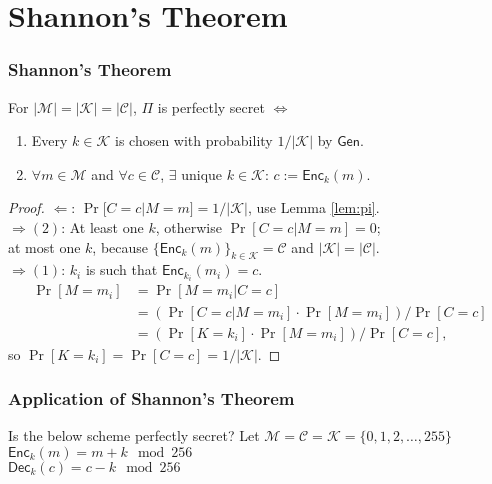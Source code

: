 \section{Shannon's Theorem}
\begin{frame}\frametitle{Shannon's Theorem}
\begin{theorem}
For $|\mathcal{M}| = |\mathcal{K}| = |\mathcal{C}|$, $\Pi$ is perfectly secret $\iff$
\begin{enumerate}
\item Every $k \in \mathcal{K}$ is chosen with probability $1/|\mathcal{K}|$ by $\mathsf{Gen}$.
\item $\forall m \in \mathcal{M}$ and $\forall c \in \mathcal{C}$, $\exists$ unique $k \in \mathcal{K}$: $c := \mathsf{Enc}_k(m)$.
\end{enumerate}
\end{theorem}
\begin{proof}
$\Leftarrow$: $\Pr[C=c|M=m]=1/|\mathcal{K}|$, use Lemma \ref{lem:pi}. \\
$\Rightarrow (2)$: At least one $k$, otherwise $\Pr[C=c|M=m]=0$; \\
at most one $k$, because $\{\mathsf{Enc}_k(m)\}_{k\in \mathcal{K}} = \mathcal{C}$ and $|\mathcal{K}| = |\mathcal{C}|$.\\
$\Rightarrow (1)$: $k_i$ is such that $\mathsf{Enc}_{k_i}(m_i)=c$.
\[ \begin{split}
\Pr[M = m_i] &= \Pr[M=m_i|C=c] \\
             &= \left( \Pr[C =c|M=m_i] \cdot \Pr[M = m_i] \right) / \Pr[C=c] \\
 &= \left( \Pr[K=k_i] \cdot \Pr[M = m_i] \right) / \Pr[C=c],
\end{split}
\]
so $\Pr[K=k_i] = \Pr[C = c] = 1/|\mathcal{K}|$.
\end{proof}
\end{frame}

\begin{frame}\frametitle{Application of Shannon's Theorem}
\begin{exampleblock}{Is the below scheme perfectly secret?}
Let $\mathcal{M} = \mathcal{C} = \mathcal{K} = \{ 0, 1, 2,\dots , 255 \} $\\
$\mathsf{Enc}_k(m) = m  + k \mod 256$\\
$\mathsf{Dec}_k(c) = c - k \mod 256$
\end{exampleblock}
\end{frame}
